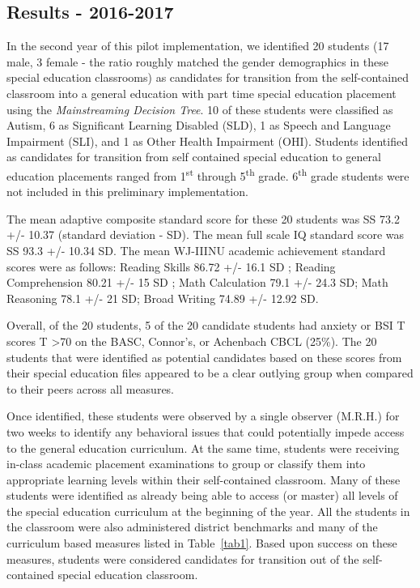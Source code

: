 \documentclass[twoside]{article}
\begin{document}
%
%
%
%
%
\clearpage
\subsection{Results - 2016-2017}
In the second year of this pilot implementation, we identified 20 students (17 male, 3 female - the ratio roughly matched the gender demographics in these special education classrooms) as candidates for transition from the self-contained classroom into a general education with part time special education placement using the \textit{Mainstreaming Decision Tree}. 10 of these students were classified as Autism, 6 as Significant Learning Disabled (SLD), 1 as Speech and Language Impairment (SLI), and 1 as Other Health Impairment (OHI). Students identified as candidates for transition from self contained special education to general education placements ranged from 1\textsuperscript{st} through 5\textsuperscript{th} grade. 6\textsuperscript{th} grade students were not included in this preliminary implementation.

The mean adaptive composite standard score for these 20 students was SS 73.2 +/- 10.37 (standard deviation - SD). The mean full scale IQ standard score was SS 93.3 +/- 10.34 SD. The mean WJ-IIINU academic achievement standard scores were as follows: Reading Skills 86.72 +/- 16.1 SD ; Reading Comprehension 80.21 +/- 15 SD ; Math Calculation 79.1 +/- 24.3 SD; Math Reasoning 78.1 +/- 21 SD; Broad Writing 74.89 +/- 12.92 SD. 

Overall, of the 20 students, 5 of the 20 candidate students had anxiety or BSI T scores T \textgreater70 on the BASC, Connor's, or Achenbach CBCL (25\%). The 20 students that were identified as potential candidates based on these scores from their special education files appeared to be a clear outlying group when compared to their peers across all measures.

Once identified, these students were observed by a single observer (M.R.H.) for two weeks to identify any behavioral issues that could potentially impede access to the general education curriculum. At the same time, students were receiving in-class academic placement examinations to group or classify them into appropriate learning levels within their self-contained classroom. Many of these students were identified as already being able to access (or master) all levels of the special education curriculum at the beginning of the year. All the students in the classroom were also administered district benchmarks and many of the curriculum based measures listed in Table~\ref{tab1}. Based upon success on these measures, students were considered candidates for transition out of the self-contained special education classroom.
\end{document}
